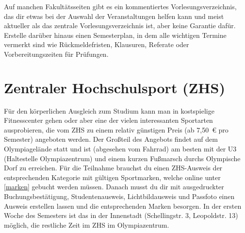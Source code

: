 Auf manchen Fakultätsseiten gibt es ein kommentiertes Vorlesungsverzeichnis, das dir etwas bei der Auswahl der Veranstaltungen helfen kann und meist aktueller als das zentrale Vorlesungsverzeichnis ist, aber keine Garantie dafür. Erstelle darüber hinaus einen Semesterplan, in dem alle wichtigen Termine vermerkt sind wie Rückmeldefristen, Klausuren, Referate oder Vorbereitungszeiten für Prüfungen.

\begin{urlList}
\end{urlList}

	




\section{Zentraler Hochschulsport (ZHS)}

Für den körperlichen Ausgleich zum Studium kann man in kostspielige
Fitnesscenter gehen oder aber eine der vielen interessanten Sportarten
ausprobieren, die vom ZHS zu einem relativ günstigen Preis (ab 7,50~€ pro
Semester) angeboten werden. Der Großteil des Angebots findet auf dem
Olympiagelände statt und ist (abgesehen vom Fahrrad) am besten mit der U3
(Haltestelle Olympiazentrum) und einem kurzen Fußmarsch durchs Olympische Dorf
zu erreichen. Für die Teilnahme brauchst du einen ZHS-Ausweis der
entsprechenden Kategorie mit gültigen Sportmarken, welche online unter
\ref{marken} gebucht werden müssen. Danach musst du dir mit ausgedruckter
Buchungsbestätigung, Studentenausweis, Lichtbildausweis und Passfoto einen
Ausweis erstellen lassen und die entsprechenden Marken besorgen. In der ersten
Woche des Semesters ist das in der Innenstadt (Schellingstr. 3, Leopoldstr. 13)
möglich, die restliche Zeit im ZHS im Olympiazentrum. 

